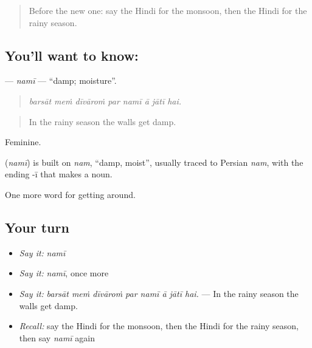 \label{lesson:HI-C437-nami}



\begin{quote}
Before the new one: say the Hindi for the monsoon, then the Hindi for the rainy season.
\end{quote}

\subsection*{You'll want to know: }
\textbf{} — \emph{namī} — \textquotedblleft{}damp; moisture\textquotedblright{}.

\begin{quote}
       
\end{quote}

\begin{quote}
\emph{barsāt meṁ dīvāroṁ par namī ā jātī hai.}
\end{quote}

\begin{quote}
In the rainy season the walls get damp.
\end{quote}

Feminine.

\begin{cousinweb}
\textbf{} (\emph{namī}) is built on \emph{nam}, \textquotedblleft{}damp, moist\textquotedblright{}, usually traced to Persian \emph{nam}, with the ending -ī that makes a noun.
\end{cousinweb}

\begin{grammarlens}[title={What you've built}]
One more word for getting around.
\end{grammarlens}

\subsection*{Your turn}
\begin{itemize}
\raggedright
  \item \emph{Say it:} \emph{namī}
  \item \emph{Say it:} \emph{namī}, once more
  \item \emph{Say it:} \emph{barsāt meṁ dīvāroṁ par namī ā jātī hai.} — In the rainy season the walls get damp.
  \item \emph{Recall:} say the Hindi for the monsoon, then the Hindi for the rainy season, then say \emph{namī} again
\end{itemize}

